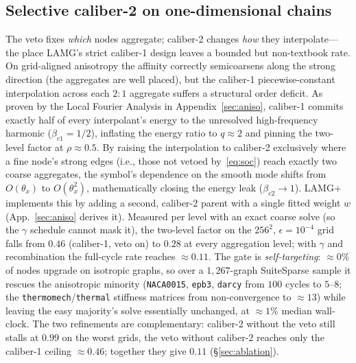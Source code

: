 \documentclass{siamart220329}
\begin{document}
\subsection{Selective caliber-2 on one-dimensional chains}\label{sec:cal2}
The veto fixes \emph{which} nodes aggregate; caliber-2 changes \emph{how} they
interpolate---the place LAMG's strict caliber-1 design leaves a bounded but non-textbook
rate. On grid-aligned anisotropy the affinity correctly semicoarsens along the strong direction
(the aggregates are well placed), but the caliber-1 piecewise-constant interpolation across each
$2{:}1$ aggregate suffers a structural order deficit. As proven by the Local Fourier Analysis
in Appendix~\ref{sec:aniso}, caliber-1 commits exactly half of every interpolant's energy to
the unresolved high-frequency harmonic ($\beta_{c1}=1/2$), inflating the energy ratio to
$q\approx2$ and pinning the two-level factor at $\rho\approx0.5$. By raising the interpolation
to caliber-2 exclusively where a fine node's strong edges (i.e., those not vetoed
by~\eqref{eq:soc}) reach exactly two coarse aggregates, the symbol's dependence on the smooth
mode shifts from
$O(\theta_x)$ to $O(\theta_x^2)$, mathematically closing the energy leak ($\beta_{c2}\to1$).
LAMG+ implements this by adding a second, caliber-2 parent with a single fitted weight $w$
(App.~\ref{sec:aniso} derives it). Measured per level with an exact coarse solve (so the
$\gamma$ schedule cannot mask it), the two-level factor on the $256^2$, $\epsilon=10^{-4}$ grid
falls from $0.46$ (caliber-1, veto on) to $0.28$ at every aggregation level; with $\gamma$ and
recombination the full-cycle rate reaches $\approx0.11$. The gate is \emph{self-targeting}:
$\approx\!0\%$ of nodes upgrade on isotropic graphs, so over a $1{,}267$-graph SuiteSparse
sample it rescues the anisotropic minority (\texttt{NACA0015}, \texttt{epb3}, \texttt{darcy}
from $100$ cycles to $5$--$8$; the \texttt{thermomech}/\texttt{thermal} stiffness matrices from
non-convergence to $\approx\!13$) while leaving the easy majority's solve essentially unchanged,
at $\approx\!1\%$ median wall-clock. The two refinements are complementary:
caliber-2 without the veto still stalls at $0.99$ on the worst grids, the veto without caliber-2
reaches only the caliber-1 ceiling $\approx0.46$; together they give $0.11$ (\S\ref{sec:ablation}).
\end{document}
